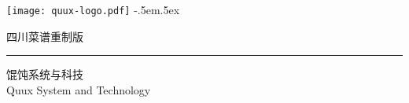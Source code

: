 
\begingroup%
\texttt{[image: quux-logo.pdf]}%
{\sffamily\tiny\kern-.5em\lower.5ex\hbox{\texttrademark}}%
\endgroup%

\vfill

\begin{flushright}
\singlespacing
\footnotesize%
四川菜谱{}重制版%
	\mbox{\hspace{.87814pt}}%

\vspace{-.3125\baselineskip}%
\rule{73.11665pt}{1pt}%
\vspace{.1875\baselineskip}%

馄饨系统与科技%
	\mbox{\hspace{10.20990pt}}\\%
{\sffamily\tiny Quux System and Technology}%
\end{flushright}

